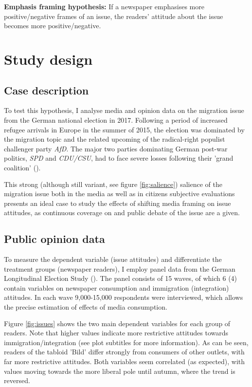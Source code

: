 \documentclass{article}
\begin{document}
\textbf{Emphasis framing hypothesis:} If a newspaper emphasises more positive/negative frames of an issue, the readers' attitude about the issue becomes more positive/negative.




\section{Study design}

\subsection{Case description}

To test this hypothesis, I analyse media and opinion data on the migration issue from the German national election in 2017. Following a period of increased refugee arrivals in Europe in the summer of 2015, the election was dominated by the migration topic and the related upcoming of the radical-right populist challenger party \textit{AfD}. The major two parties dominating German post-war politics, \textit{SPD} and \textit{CDU/CSU}, had to face severe losses following their 'grand coalition' (\cite{Bieber2021, Wessels2021}).

This strong (although still variant, see figure \ref{fig:salience}) salience of the migration issue both in the media as well as in citizens subjective evaluations presents an ideal case to study the effects of shifting media framing on issue attitudes, as continuous coverage on and public debate of the issue are a given.

\subsection{Public opinion data}

To measure the dependent variable (issue attitudes) and differentiate the treatment groups (newspaper readers), I employ panel data from the German Longitudinal Election Study (\cite{GLES2019LongTermTracking}). The panel consists of 15 waves, of which 6 (4) contain variables on newspaper consumption and immigration (integration) attitudes. In each wave 9,000-15,000 respondents were interviewed, which allows the precise estimation of effects of media consumption.

Figure \ref{fig:issues} shows the two main dependent variables for each group of readers. Note that higher values indicate more restrictive attitudes towards immigration/integration (see plot subtitles for more information). As can be seen, readers of the tabloid 'Bild' differ strongly from consumers of other outlets, with far more restrictive attitudes. Both variables seem correlated (as expected), with values moving towards the more liberal pole until autumn, where the trend is reversed.
\end{document}
